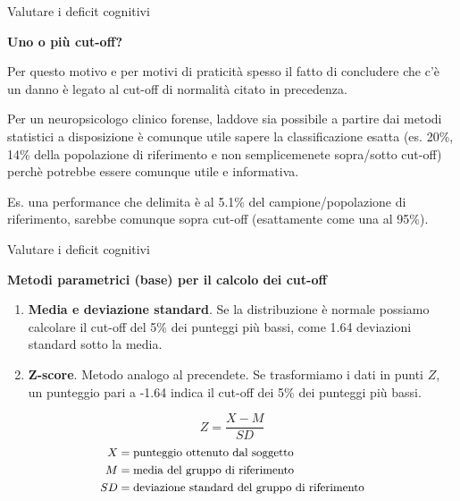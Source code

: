 \documentclass[
  ignorenonframetext,
]{beamer}
\begin{document}
\begin{frame}{Valutare i deficit cognitivi}
\label{valutare-i-deficit-cognitivi-15}
\begin{center}
  \textbf{Uno o più cut-off?}
\end{center}

Per questo motivo e per motivi di praticità spesso il fatto di
concludere che c'è un danno è legato al cut-off di normalità citato in
precedenza.

Per un neuropsicologo clinico forense, laddove sia possibile a partire
dai metodi statistici a disposizione è comunque utile sapere la
classificazione esatta (es. 20\%, 14\% della popolazione di riferimento
e non semplicemenete sopra/sotto cut-off) perchè potrebbe essere
comunque utile e informativa.

Es. una performance che delimita è al 5.1\% del campione/popolazione di
riferimento, sarebbe comunque sopra cut-off (esattamente come una al
95\%).
\end{frame}

\begin{frame}{Valutare i deficit cognitivi}
\label{valutare-i-deficit-cognitivi-16}
\begin{center}
  \textbf{Metodi parametrici (base) per il calcolo dei cut-off}
\end{center}

\begin{enumerate}
[1)]
\item
  \textbf{Media e deviazione standard}. Se la distribuzione è normale
  possiamo calcolare il cut-off del 5\% dei punteggi più bassi, come
  1.64 deviazioni standard sotto la media.
\item
  \textbf{Z-score}. Metodo analogo al precendete. Se trasformiamo i dati
  in punti \(Z\), un punteggio pari a -1.64 indica il cut-off dei 5\%
  dei punteggi più bassi.
\end{enumerate}

\[
Z = \frac{X - M}{SD}
\] \[
\small
\begin{aligned}
X & = \text{punteggio ottenuto dal soggetto} \\
M & = \text{media del gruppo di riferimento} \\
SD & = \text{deviazione standard del gruppo di riferimento} \\
\end{aligned}
\]
\end{frame}
\end{document}
